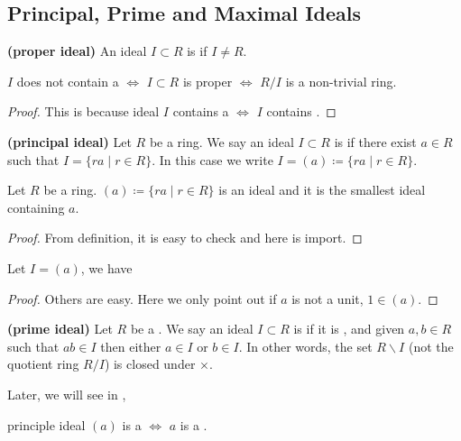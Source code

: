 \documentclass{article}
\newcommand{\bfs}[1]{\textbf{({#1}) }}
\begin{document}
\subsection{Principal, Prime and Maximal Ideals}
\begin{defa}\bfs{proper ideal}
An ideal $I \subset R$ is  if $I \neq R$.
\end{defa} 
\begin{lema}
 $I$ does not contain a  $\Longleftrightarrow$ $I \subset R$ is proper $\Longleftrightarrow$ $R / I$ is a non-trivial ring.
\end{lema}
\begin{proof}
 This is because ideal $I$ contains a  $\Longleftrightarrow$ $I$ contains .
\end{proof}
\begin{defa}\bfs{principal ideal}
Let $R$ be a  ring. We say an ideal $I \subset R$ is  if there exist $a \in R$ such that $I=\{r a \mid r \in R\}$. In this case we write $I=(a)\coloneqq \{r a \mid r \in R\}$.
\end{defa} 
\begin{lema}
Let $R$ be a  ring.  $(a)\coloneqq \{r a \mid r \in R\}$ is an ideal and it is the smallest ideal containing $a$.
\end{lema}
\begin{proof}
 From definition, it is easy to check and here  is import.
\end{proof}
\begin{lema}
Let  $I = (a)$, we have 

\centerline{}
\end{lema}
\begin{proof}
Others are easy. Here we only point out if $a$ is not a unit, $1\in (a)$.
\end{proof}
\begin{defa}\bfs{prime ideal}\label{rem:dmdmfeoald}
Let $R$ be a . We say an ideal $I \subset R$ is  if it is , and given $a, b \in R$ such that $a b \in I$ then either $a \in I$ or $b \in I$. In other words, the set $R\backslash I$ (not the quotient ring $R/I$) is closed under $\times$. 
\end{defa}
\begin{rema}
Later, we will see in , 

\centerline{principle ideal $(a)$ is a  $\Longleftrightarrow$ $a$ is a .}
\end{rema}
\end{document}
